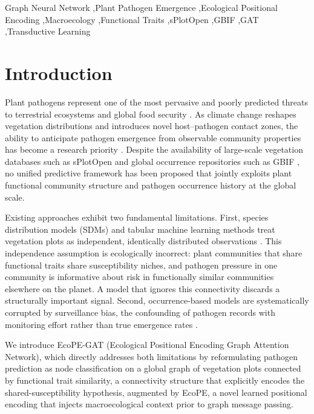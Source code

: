 \documentclass[a4paper,fleqn]{cas-sc}
\begin{document}
\begin{keywords}
Graph Neural Network \sep Plant Pathogen Emergence \sep Ecological Positional Encoding \sep Macroecology \sep Functional Traits \sep sPlotOpen \sep GBIF \sep GAT \sep Transductive Learning
\end{keywords}

{\hfuzz=118pt\maketitle}

\section{Introduction}

Plant pathogens represent one of the most pervasive and poorly predicted threats to terrestrial ecosystems and global food security \citep{bebber2014,fisher2012}. As climate change reshapes vegetation distributions and introduces novel host--pathogen contact zones, the ability to anticipate pathogen emergence from observable community properties has become a research priority \citep{fisher2012}. Despite the availability of large-scale vegetation databases such as sPlotOpen \citep{sabatini2021} and global occurrence repositories such as GBIF \citep{gbif2023}, no unified predictive framework has been proposed that jointly exploits plant functional community structure and pathogen occurrence history at the global scale.

Existing approaches exhibit two fundamental limitations. First, species distribution models (SDMs) and tabular machine learning methods treat vegetation plots as independent, identically distributed observations \citep{elith2009,guillera2015}. This independence assumption is ecologically incorrect: plant communities that share functional traits share susceptibility niches, and pathogen pressure in one community is informative about risk in functionally similar communities elsewhere on the planet. A model that ignores this connectivity discards a structurally important signal. Second, occurrence-based models are systematically corrupted by surveillance bias, the confounding of pathogen records with monitoring effort rather than true emergence rates \citep{beck2014}.

We introduce EcoPE-GAT (Ecological Positional Encoding Graph Attention Network), which directly addresses both limitations by reformulating pathogen prediction as node classification on a global graph of vegetation plots connected by functional trait similarity, a connectivity structure that explicitly encodes the shared-susceptibility hypothesis, augmented by EcoPE, a novel learned positional encoding that injects macroecological context prior to graph message passing.
\end{document}

